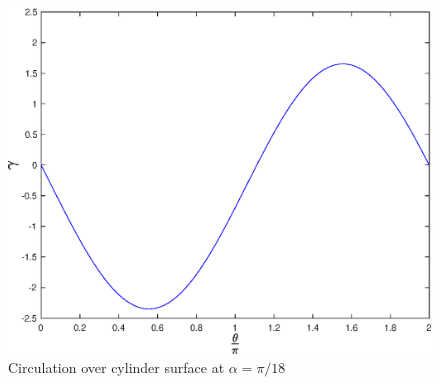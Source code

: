 \begin{figure}[htbp]
\centering
\includegraphics[scale=0.65]{graphs/e5g2.eps}
\caption{Circulation over cylinder surface at $\alpha = \pi/18$}
\label{e5g1}
\end{figure}

